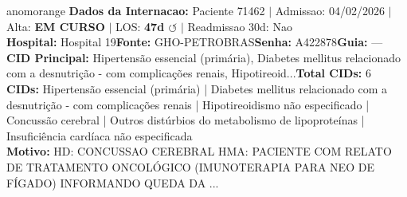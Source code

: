 \documentclass[a4paper,10pt]{article}
\begin{document}
\begin{anomalycard}[Internacao 164488 | GHO-PETROBRAS | ALTO (z=3.91)]{anomorange}
\textbf{Dados da Internacao:} Paciente 71462 $\mid$ Admissao: 04/02/2026 $\mid$ Alta: \textcolor{anomorange}{\textbf{EM CURSO}} $\mid$ LOS: \textbf{47d \textcolor{anomorange}{$\circlearrowleft$}} $\mid$ Readmissao 30d: Nao\\
\textbf{Hospital:} Hospital 19\quad\textbf{Fonte:} GHO-PETROBRAS\quad\textbf{Senha:} A422878\quad\textbf{Guia:} ---\\
\textbf{CID Principal:} {\small Hipertensão essencial (primária), Diabetes mellitus relacionado com a desnutrição - com complicações renais, Hipotireoid...}\quad\textbf{Total CIDs:} 6\\

\textbf{CIDs:} {\scriptsize Hipertensão essencial (primária) | Diabetes mellitus relacionado com a desnutrição - com complicações renais | Hipotireoidismo não especificado | Concussão cerebral | Outros distúrbios do metabolismo de lipoproteínas | Insuficiência cardíaca não especificada}\\

\textbf{Motivo:} {\scriptsize HD: CONCUSSAO CEREBRAL  HMA: PACIENTE COM RELATO DE TRATAMENTO ONCOLÓGICO (IMUNOTERAPIA PARA NEO DE FÍGADO) INFORMANDO QUEDA DA ...}\\


\end{anomalycard}
\end{document}
